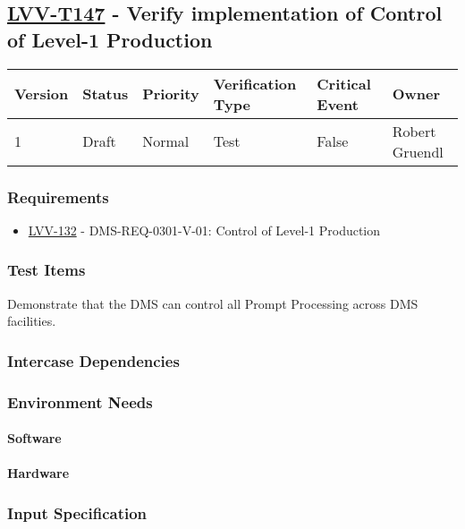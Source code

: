 \subsection{\href{https://jira.lsstcorp.org/secure/Tests.jspa\#/testCase/LVV-T147}{LVV-T147}
    - Verify implementation of Control of Level-1 Production}\label{lvv-t147}

\begin{longtable}[]{llllll}
\toprule
Version & Status & Priority & Verification Type & Critical Event & Owner
\\\midrule
1 & Draft & Normal &
Test & False & Robert Gruendl
\\\bottomrule
\end{longtable}

\subsubsection{Requirements}
\begin{itemize}
\item \href{https://jira.lsstcorp.org/browse/LVV-132}{LVV-132} - DMS-REQ-0301-V-01: Control of Level-1 Production
\end{itemize}

\subsubsection{Test Items}
Demonstrate that the DMS can control all Prompt Processing across DMS
facilities.



\subsubsection{Intercase Dependencies}

\subsubsection{Environment Needs}

\paragraph{Software}

\paragraph{Hardware}

\subsubsection{Input Specification}

